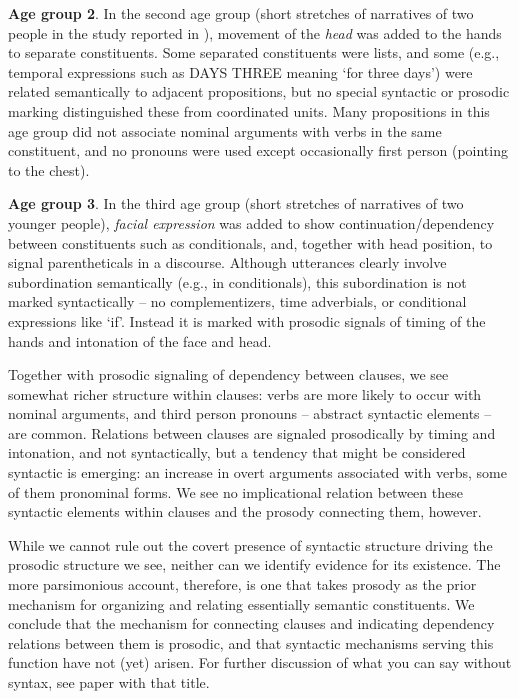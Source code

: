 \documentclass[output=paper]{langsci/langscibook}
\begin{document}
\textbf{Age group 2}.  In the second age group (short stretches of narratives of two people in the study reported in \citealt{Sandler2011b}), movement of the \textit{head} was added to the hands to separate constituents.  Some separated constituents were lists, and some (e.g., temporal expressions such as DAYS THREE meaning ‘for three days’) were related semantically to adjacent propositions, but no special syntactic or prosodic marking distinguished these from coordinated units.  Many propositions in this age group did not associate nominal arguments with verbs in the same constituent, and no pronouns were used except occasionally first person (pointing to the chest).  

   \textbf{Age group 3}.  In the third age group (short stretches of narratives of two younger people), \textit{facial expression} was added to show continuation/dependency between constituents such as conditionals, and, together with head position, to signal parentheticals in a discourse.  Although utterances clearly involve subordination semantically (e.g., in conditionals), this subordination is not marked syntactically – no complementizers, time adverbials, or conditional expressions like ‘if’.  Instead it is marked with prosodic signals of timing of the hands and intonation of the face and head.   

Together with prosodic signaling of dependency between clauses, we see somewhat richer structure within clauses:  verbs are more likely to occur with nominal arguments, and third person pronouns -- abstract syntactic elements -- are common.  Relations between clauses are signaled prosodically by timing and intonation, and not syntactically, but a tendency that might be considered syntactic is emerging:  an increase in overt arguments associated with verbs, some of them pronominal forms. We see no implicational relation between these syntactic elements within clauses and the prosody connecting them, however.  

While we cannot rule out the covert presence of syntactic structure driving the prosodic structure we see, neither can we identify evidence for its existence.  The more parsimonious account, therefore, is one that takes prosody as the prior mechanism for organizing and relating essentially semantic constituents.  We conclude that the mechanism for connecting clauses and indicating dependency relations between them is prosodic, and that syntactic mechanisms serving this function have not (yet) arisen.  For further discussion of what you can say without syntax, see  paper with that title. 
 
\end{document}
